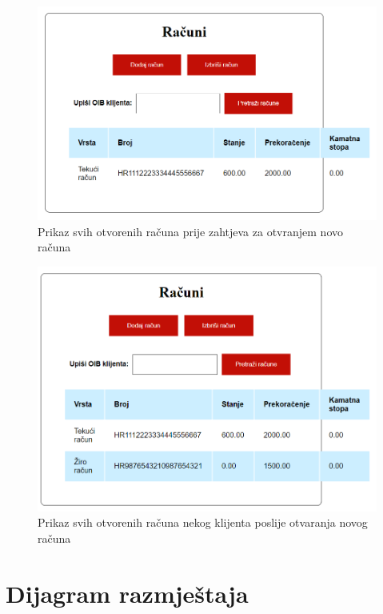 	\begin{figure}[H]
		\includegraphics[scale=0.7]{slike/racuniklijentaprije.PNG}
		\centering
		\caption{Prikaz svih otvorenih računa prije zahtjeva za otvranjem novo računa}
		\label{fig:racprije}
	\end{figure}
	\begin{figure}[H]
		\includegraphics[scale=0.7]{slike/racuniklijentaposlije.PNG}
		\centering
		\caption{Prikaz svih otvorenih računa nekog klijenta poslije otvaranja novog računa}
		\label{fig:racposlije}
	\end{figure}

			
			\eject 
		
		
		\section{Dijagram razmještaja}
			
